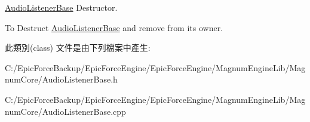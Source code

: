 \hyperlink{class_magnum_1_1_audio_listener_base}{Audio\+Listener\+Base} Destructor. 

To Destruct \hyperlink{class_magnum_1_1_audio_listener_base}{Audio\+Listener\+Base} and remove from its owner. 

此類別(class) 文件是由下列檔案中產生\+:\begin{DoxyCompactItemize}
\item 
C\+:/\+Epic\+Force\+Backup/\+Epic\+Force\+Engine/\+Epic\+Force\+Engine/\+Magnum\+Engine\+Lib/\+Magnum\+Core/Audio\+Listener\+Base.\+h\item 
C\+:/\+Epic\+Force\+Backup/\+Epic\+Force\+Engine/\+Epic\+Force\+Engine/\+Magnum\+Engine\+Lib/\+Magnum\+Core/Audio\+Listener\+Base.\+cpp\end{DoxyCompactItemize}
